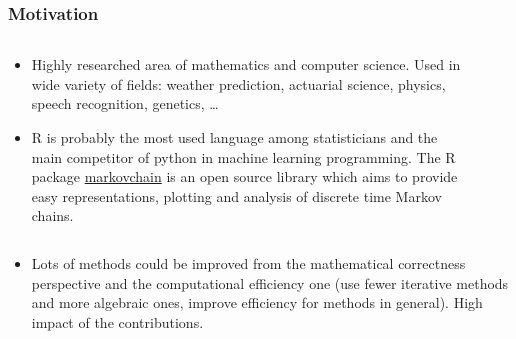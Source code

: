 \begin{frame}\frametitle{Motivation}
 \begin{columns}
 \begin{column}{0.5\textwidth}
  \begin{itemize}
   \item Highly researched area of mathematics and computer science. Used in 
   wide variety of fields: weather prediction, actuarial science, physics,
   speech recognition, genetics, \ldots
   \item R is probably the most used language among statisticians and the main 
   competitor of python in machine learning programming. The R package 
   \href{https://github.com/spedygiorgio/markovchain}{markovchain} is an 
   open source library which aims to provide easy representations, plotting 
   and analysis of discrete time Markov chains.
  \end{itemize}
 \end{column}
 
 \begin{column}{0.4\textwidth}
   \begin{figure}[htbp]
  \centering
  
  \end{figure}
 \end{column}
\end{columns}
 
 \begin{columns}
  \begin{column}{\textwidth}
  \begin{itemize}
  \item Lots of methods could be improved from the mathematical correctness perspective
   and the computational efficiency one (use fewer iterative methods and more algebraic 
   ones, improve efficiency for methods in general). High impact of the contributions.
  \end{itemize}
  \end{column}
 \end{columns}
\end{frame}

